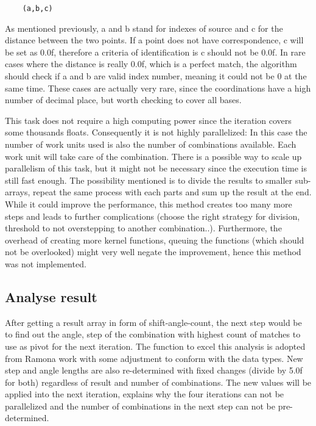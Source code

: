 \begin{lstlisting}
	(a,b,c)
\end{lstlisting}

As mentioned previously, a and b stand for indexes of source and c for the distance between the two points. If a point does not have correspondence, c will be set as 0.0f, therefore a criteria of identification is c should not be 0.0f. In rare cases where the distance is really 0.0f, which is a perfect match, the algorithm should check if a and b are valid index number, meaning it could not be 0 at the same time. These cases are actually very rare, since the coordinations have a high number of decimal place, but worth checking to cover all bases. 

This task does not require a high computing power since the iteration covers some thousands floats. Consequently it is not highly parallelized: In this case the number of work units used is also the number of combinations available. Each work unit will take care of the combination. There is a possible way to scale up parallelism of this task, but it might not be necessary since the execution time is still fast enough. The possibility mentioned is to divide the results to smaller sub-arrays, repeat the same process with each parts and sum up the result at the end. While it could improve the performance, this method creates too many more steps and leads to further complications (choose the right strategy for division, threshold to not overstepping to another combination..). Furthermore, the overhead of creating more kernel functions, queuing the functions (which should not be overlooked) might very well negate the improvement, hence this method was not implemented.

\subsection{Analyse result}

After getting a result array in form of shift-angle-count, the next step would be to find out the angle, step of the combination with highest count of matches to use as pivot for the next iteration. The function to excel this analysis is adopted from Ramona work with some adjustment to conform with the data types. New step and angle lengths are also re-determined with fixed changes (divide by 5.0f for both) regardless of result and number of combinations. The new values will be applied into the next iteration, explains why the four iterations can not be parallelized and the number of combinations in the next step can not be pre-determined.

